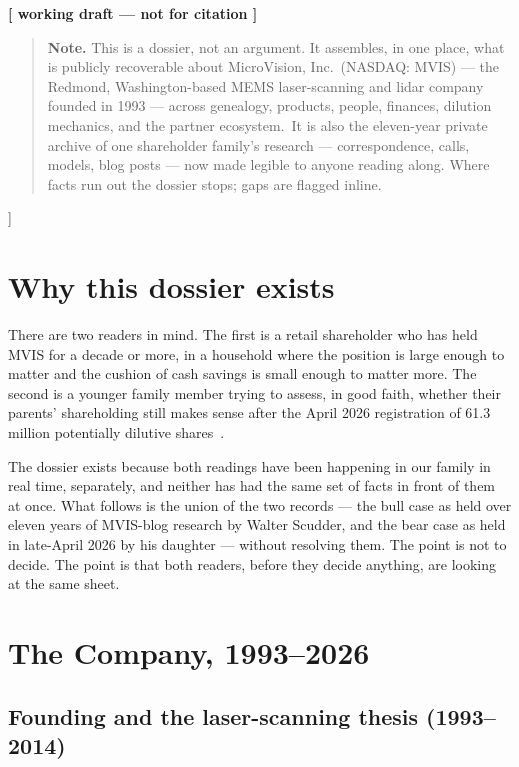 \documentclass[10pt,letterpaper,twocolumn]{article}
\begin{document}
{\begin{center}
{\small\color{acpink}\textbf{[ working draft --- not for citation ]}}
\end{center}
\vspace{0.3em}

\begin{quote}
\small\noindent\textbf{Note.} This is a dossier, not an argument. It assembles, in one place, what is publicly recoverable about MicroVision, Inc.\ (NASDAQ: MVIS) --- the Redmond, Washington-based MEMS laser-scanning and lidar company founded in 1993 --- across genealogy, products, people, finances, dilution mechanics, and the partner ecosystem.\ It is also the eleven-year private archive of one shareholder family's research --- correspondence, calls, models, blog posts --- now made legible to anyone reading along. Where facts run out the dossier stops; gaps are flagged inline.
\end{quote}
\vspace{0.5em}
}]

\section{Why this dossier exists}

There are two readers in mind. The first is a retail shareholder who has held MVIS for a decade or more, in a household where the position is large enough to matter and the cushion of cash savings is small enough to matter more. The second is a younger family member trying to assess, in good faith, whether their parents' shareholding still makes sense after the April 2026 registration of 61.3 million potentially dilutive shares~\citep{mvis2026s3}.

The dossier exists because both readings have been happening in our family in real time, separately, and neither has had the same set of facts in front of them at once. What follows is the union of the two records --- the bull case as held over eleven years of MVIS-blog research by Walter Scudder, and the bear case as held in late-April 2026 by his daughter --- without resolving them. The point is not to decide. The point is that both readers, before they decide anything, are looking at the same sheet.

\section{The Company, 1993--2026}

\subsection{Founding and the laser-scanning thesis (1993--2014)}
\end{document}
